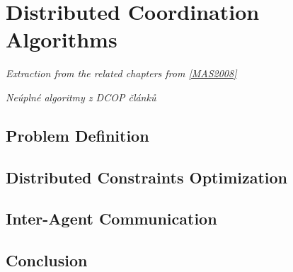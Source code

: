 \chapter{Distributed Coordination Algorithms}
\label{chap_mas}

\emph{Extraction from the related chapters from \ref{MAS2008}}

\emph{Neúplné algoritmy z DCOP článků}
\section{Problem Definition}
\emph{}

\section{Distributed Constraints Optimization}

\section{Inter-Agent Communication}

\section{Conclusion}
